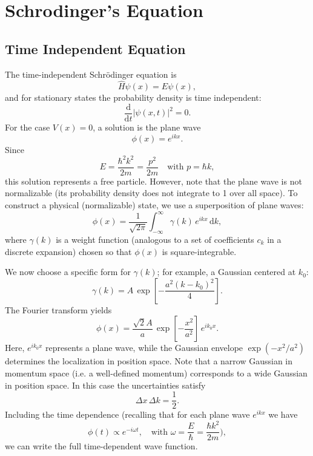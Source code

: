 \chapter{Schrodinger's Equation}
\section{Time Independent Equation}
\begin{remark}
The time-independent Schrödinger equation is 
\[
    \hat{H} \psi(x) = E \psi(x),
\]
and for stationary states the probability density is time independent:
\[
    \frac{\mathrm{d}}{\mathrm{d}t} \left|\psi(x,t)\right|^2 = 0.
\]
For the case \(V(x)=0\), a solution is the plane wave
\[
    \phi(x) = e^{ikx}.
\]
Since
\[
    E = \frac{\hbar^2 k^2}{2m} = \frac{p^2}{2m}\quad\text{with } p=\hbar k,
\]
this solution represents a free particle. However, note that the plane wave is not normalizable (its probability density does not integrate to 1 over all space). To construct a physical (normalizable) state, we use a superposition of plane waves:
\[
    \phi(x) = \frac{1}{\sqrt{2\pi}} \int_{-\infty}^{\infty} \gamma(k) \, e^{ikx}\, \mathrm{d}k,
\]
where \(\gamma(k)\) is a weight function (analogous to a set of coefficients \(c_k\) in a discrete expansion) chosen so that \(\phi(x)\) is square-integrable.
\end{remark}

\begin{remark}
We now choose a specific form for \(\gamma(k)\); for example, a Gaussian centered at \(k_0\):
\[
    \gamma(k) = A\, \exp\!\left[-\frac{a^2 (k-k_0)^2}{4}\right].
\]
The Fourier transform yields
\[
    \phi(x) = \frac{\sqrt{2}A}{a}\,\exp\!\left[-\frac{x^2}{a^2}\right]\,e^{ik_0 x}.
\]
Here, \(e^{ik_0 x}\) represents a plane wave, while the Gaussian envelope \(\exp(-x^2/a^2)\) determines the localization in position space. Note that a narrow Gaussian in momentum space (i.e. a well-defined momentum) corresponds to a wide Gaussian in position space. In this case the uncertainties satisfy
\[
    \Delta x\, \Delta k = \frac{1}{2}.
\]
Including the time dependence (recalling that for each plane wave \(e^{ikx}\) we have
\[
    \phi(t) \propto e^{-i\omega t},\quad\text{with }\omega = \frac{E}{\hbar} = \frac{\hbar k^2}{2m}),
\]
we can write the full time-dependent wave function.
\end{remark}

